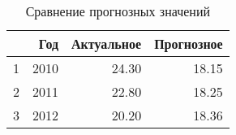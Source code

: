 \begin{table}[ht]
\centering
\begin{tabular}{rrrr}
  \hline
 & Год & Актуальное & Прогнозное \\ 
  \hline
1 & 2010 & 24.30 & 18.15 \\ 
  2 & 2011 & 22.80 & 18.25 \\ 
  3 & 2012 & 20.20 & 18.36 \\ 
   \hline
\end{tabular}
\caption{Сравнение прогнозных значений} 
\label{table:prediction_trend}
\end{table}
